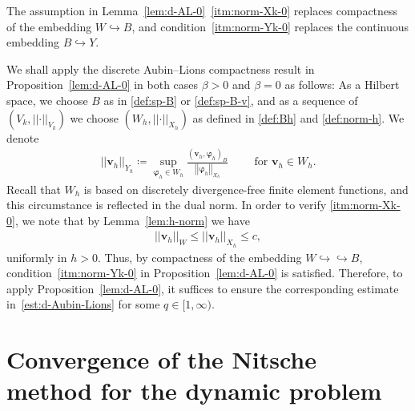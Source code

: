 \documentclass[reqno,a4paper]{amsart}
\def\norm#1{\left|\!\left| #1 \right|\!\right|}
\def\vec#1{\boldsymbol{#1}}
\def\bv{\vec{v}}
\def\bphi{\vec{\varphi}}
\begin{document}
\begin{remark}
	The assumption in Lemma~\ref{lem:d-AL-0}~\ref{itm:norm-Xk-0} replaces compactness of the embedding $W \hookrightarrow B$, and condition~\ref{itm:norm-Yk-0} replaces the continuous embedding $B \hookrightarrow Y$. 
\end{remark}

\begin{remark}\label{rmk:AL-appl}
	We shall apply the discrete Aubin--Lions compactness result in Proposition~\ref{lem:d-AL-0} in both cases $\beta > 0$ and $\beta = 0$ as follows: 
	As a Hilbert space, we choose $B$ as in \eqref{def:sp-B} or \eqref{def:sp-B-v}, and as a sequence of $(V_k,\norm{\cdot}_{V_k})$ we choose $(W_h, \norm{\cdot}_{X_h})$ as defined in \eqref{def:Bh} and \eqref{def:norm-h}. 
	We denote
	\begin{align}\label{def:Yh}
		\norm{ \bv_h}_{Y_h} 
		\coloneqq \sup_{\bphi_h  \in W_h} \frac{( \bv_h, \bphi_h)_B}{\norm{ \bphi_h}_{X_h}} \qquad \text{ for } \bv_h \in W_h. 
	\end{align}
	Recall that $W_h$ is based on discretely divergence-free finite element functions, and this circumstance is reflected in the dual norm.  
	In order to verify \ref{itm:norm-Xk-0}, we note that by Lemma~\ref{lem:h-norm} we have 
	\begin{align*}
		\norm{ \bv_h}_{W} \leq  \norm{ \bv_h}_{X_h} \leq c,
	\end{align*}
	uniformly in $h>0$. 
	Thus, by compactness of the embedding $W \hookrightarrow\hookrightarrow B $, condition~\ref{itm:norm-Yk-0} in Proposition~\ref{lem:d-AL-0} is satisfied.  
	Therefore, to apply Proposition~\ref{lem:d-AL-0}, it suffices to ensure the corresponding estimate in~\eqref{est:d-Aubin-Lions} for some $q \in [1,\infty)$. 
\end{remark}

\section{Convergence of the Nitsche method for the dynamic problem }
\label{sec:un-NS}	
\end{document}
